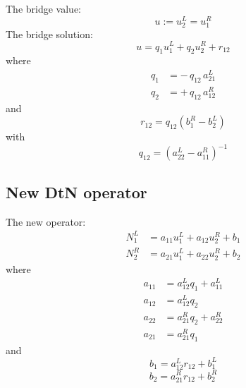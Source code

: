 \documentclass[fleqn]{article}
\begin{document}
The bridge value:
\begin{equation}
u := u_2^L = u_1^R 
\end{equation}
The bridge solution:
\begin{equation}
u = q_1 u_1^L + q_2 u_2^R + r_{12}
\end{equation}
where
\begin{subequations}
\begin{align}
q_1 &= -\,q_{12}\,a_{21}^L \\
q_2 &= +\,q_{12}\,a_{12}^R
\end{align}
\end{subequations}
and
\begin{equation}
r_{12} = q_{12} \left( b_1^R - b_2^L \right)
\end{equation}
with
\begin{equation}
q_{12} = \left(a_{22}^L - a_{11}^R\right)^{-1}
\end{equation}

\subsection{New DtN operator}

The new operator:
\begin{subequations}
\begin{align}
N_1^L &= a_{11} u_1^L + a_{12} u_2^R + b_1 \\
N_2^R &= a_{21} u_1^L + a_{22} u_2^R + b_2
\end{align}
\end{subequations}
where
\begin{subequations}
\begin{align}
a_{11} &= a_{12}^L q_1 + a_{11}^L \\
a_{12} &= a_{12}^L q_2 \\
a_{22} &= a_{21}^R q_2 + a_{22}^R \\
a_{21} &= a_{21}^R q_1
\end{align}
\end{subequations}
and
\begin{equation}
b_1 = a_{12}^L r_{12} + b_1^L
\end{equation}
\begin{equation}
b_2 = a_{21}^R r_{12} + b_2^R
\end{equation}
\end{document}
